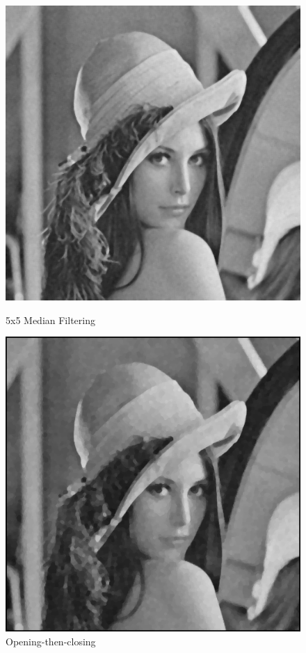 \documentclass{article}
\begin{document}
\begin{figure}[H]
  \includegraphics[width=\linewidth]{img/g10_median_5x5.png}
  \caption{5x5 Median Filtering}\label{fig:g10_median_5x5}
\endminipage\hfill
{}
  \includegraphics[width=\linewidth]{img/g10_open_then_close.png}
  \caption{Opening-then-closing}\label{fig:g10_open_then_close}
\endminipage\hfill
\end{figure}
\end{document}
